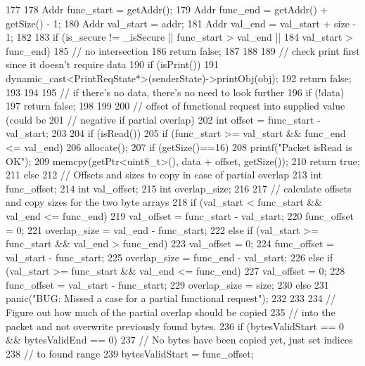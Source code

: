 \begin{DoxyCode}
177 {
178     Addr func_start = getAddr();
179     Addr func_end   = getAddr() + getSize() - 1;
180     Addr val_start  = addr;
181     Addr val_end    = val_start + size - 1;
182 
183     if (is_secure != _isSecure || func_start > val_end ||
184         val_start > func_end) {
185         // no intersection
186         return false;
187     }
188 
189     // check print first since it doesn't require data
190     if (isPrint()) {
191         dynamic_cast<PrintReqState*>(senderState)->printObj(obj);
192         return false;
193     }
194 
195     // if there's no data, there's no need to look further
196     if (!data) {
197         return false;
198     }
199 
200     // offset of functional request into supplied value (could be
201     // negative if partial overlap)
202     int offset = func_start - val_start;
203 
204     if (isRead()) {
205         if (func_start >= val_start && func_end <= val_end) {
206             allocate();
207             if (getSize()==16)
208               printf("Packet isRead is OK\n");
209             memcpy(getPtr<uint8_t>(), data + offset, getSize());
210             return true;
211         } else {
212             // Offsets and sizes to copy in case of partial overlap
213             int func_offset;
214             int val_offset;
215             int overlap_size;
216 
217             // calculate offsets and copy sizes for the two byte arrays
218             if (val_start < func_start && val_end <= func_end) {
219                 val_offset = func_start - val_start;
220                 func_offset = 0;
221                 overlap_size = val_end - func_start;
222             } else if (val_start >= func_start && val_end > func_end) {
223                 val_offset = 0;
224                 func_offset = val_start - func_start;
225                 overlap_size = func_end - val_start;
226             } else if (val_start >= func_start && val_end <= func_end) {
227                 val_offset = 0;
228                 func_offset = val_start - func_start;
229                 overlap_size = size;
230             } else {
231                 panic("BUG: Missed a case for a partial functional request");
232             }
233 
234             // Figure out how much of the partial overlap should be copied
235             // into the packet and not overwrite previously found bytes.
236             if (bytesValidStart == 0 && bytesValidEnd == 0) {
237                 // No bytes have been copied yet, just set indices
238                 // to found range
239                 bytesValidStart = func_offset;
}}}}
\end{DoxyCode}
